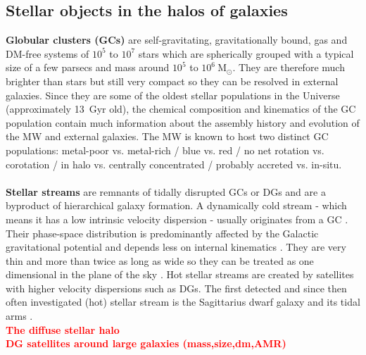 \subsection{Stellar objects in the halos of galaxies}\label{subsec:halo_objects}
\textbf{Globular clusters (\acp{GC})} are self-gravitating, gravitationally bound, gas and \ac{DM}-free systems of $10^5$ to $10^7$ stars which are spherically grouped with a typical size of a few parsecs and mass around $10^5$ to $10^6\ \mathrm{M}_\odot$. They are therefore much brighter than stars but still very compact so they can be resolved in external galaxies. Since they are some of the oldest stellar populations in the Universe (approximately \SI{13}{Gyr} old), the chemical composition and kinematics of the \ac{GC} population contain much information about the assembly history and evolution of the \ac{MW} and external galaxies. The \ac{MW} is known to host two distinct \ac{GC} populations: metal-poor vs. metal-rich / blue vs. red / no net rotation vs. corotation / in halo vs. centrally concentrated / probably accreted vs. in-situ. \\\\
\textbf{Stellar streams} are remnants of tidally disrupted \acp{GC} or \acp{DG} and are a byproduct of hierarchical galaxy formation. A dynamically cold stream - which means it has a low intrinsic velocity dispersion - usually originates from a \ac{GC} \citep{Bonaca...streamsinfo...2018}. Their phase-space distribution is predominantly affected by the Galactic gravitational potential and depends less on internal kinematics \citep{Kupper...streams...2010, Kupper...streams...2012}. They are very thin and more than twice as long as wide so they can be treated as one dimensional in the plane of the sky \citep{Bonaca...streamsinfo...2018}. Hot stellar streams are created by satellites with higher velocity dispersions such as \acp{DG}. The first detected and since then often investigated (hot) stellar stream is the Sagittarius dwarf galaxy and its tidal arms \citep{Ibata...Sagittarius....1994}.\\
\textbf{\textcolor{red}{The diffuse stellar halo}}\\
\textbf{\textcolor{red}{DG satellites around large galaxies (mass,size,dm,AMR)}}
